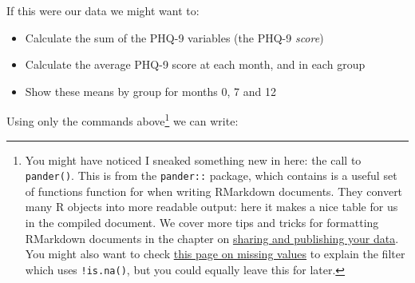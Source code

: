 \documentclass[]{article}
\providecommand{\tightlist}{%
  \setlength{\itemsep}{0pt}\setlength{\parskip}{0pt}}
\let\rmarkdownfootnote\footnote%
\def\footnote{\protect\rmarkdownfootnote}
\theoremstyle{definition}
\theoremstyle{definition}
\theoremstyle{definition}
\theoremstyle{remark}
\begin{document}
If this were our data we might want to:

\begin{itemize}
\tightlist
\item
  Calculate the sum of the PHQ-9 variables (the PHQ-9 \emph{score})
\item
  Calculate the average PHQ-9 score at each month, and in each group
\item
  Show these means by group for months 0, 7 and 12
\end{itemize}

Using only the commands above\footnote{You might have noticed I sneaked
  something new in here: the call to \texttt{pander()}. This is from the
  \texttt{pander::} package, which contains is a useful set of functions
  function for when writing RMarkdown documents. They convert many R
  objects into more readable output: here it makes a nice table for us
  in the compiled document. We cover more tips and tricks for formatting
  RMarkdown documents in the chapter on
  \protect\hyperlink{sharing-and-publication}{sharing and publishing
  your data}. You might also want to check
  \protect\hyperlink{missing}{this page on missing values} to explain
  the filter which uses \texttt{!is.na()}, but you could equally leave
  this for later.} we can write:
\end{document}
